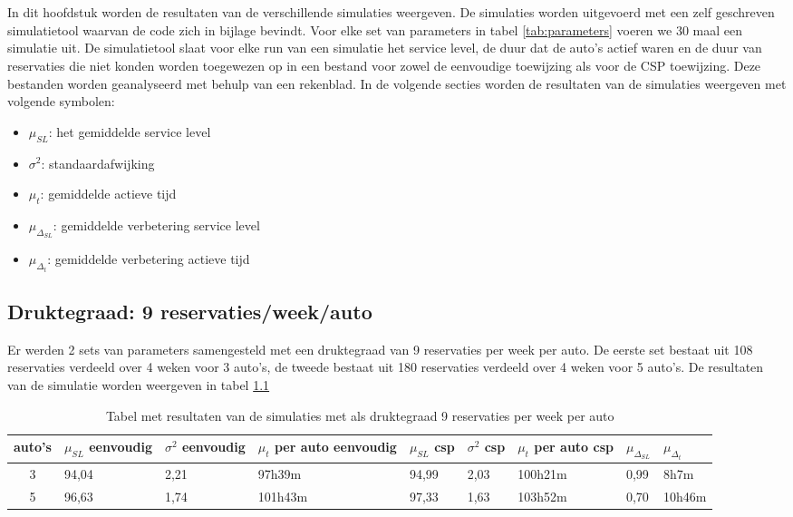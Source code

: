 \chapter{}
\label{ch:resultaten-simulaties}
In dit hoofdstuk worden de resultaten van de verschillende simulaties weergeven. De simulaties worden uitgevoerd met een zelf geschreven simulatietool waarvan de code zich in bijlage bevindt. Voor elke set van parameters in tabel \ref{tab:parameters} voeren we 30 maal een simulatie uit. De simulatietool slaat voor elke run van een simulatie het service level, de duur dat de auto's actief waren en de duur van reservaties die niet konden worden toegewezen op in een bestand voor zowel de eenvoudige toewijzing als voor de CSP toewijzing. Deze bestanden worden geanalyseerd met behulp van een rekenblad.
In de volgende secties worden de resultaten van de simulaties weergeven met volgende symbolen:
\begin{itemize}
	\item $\mu_{ SL}$: het gemiddelde service level
	\item $\sigma^2$: standaardafwijking
	\item $\mu_{ t}$: gemiddelde actieve tijd
	\item $\mu_{\Delta_{ SL}}$: gemiddelde verbetering service level
	\item $\mu_{\Delta_{ t}}$: gemiddelde verbetering actieve tijd
\end{itemize}

\section{Druktegraad: 9 reservaties/week/auto}
Er werden 2 sets van parameters samengesteld met een druktegraad van 9 reservaties per week per auto. 
De eerste set bestaat uit 108 reservaties verdeeld over 4 weken voor 3 auto's, de tweede bestaat uit 180 reservaties verdeeld over 4 weken voor 5 auto's. 
De resultaten van de simulatie worden weergeven in tabel \ref{tab:resultaten9}
\begin{table}[h]
	\centering
	\begin{tabular}{ | c | p{1.5cm} | p{1.5cm} | p{1.5cm} | p{1.5cm} | p{1.5cm} | p{1.5cm} | p{1.5cm} | p{1.5cm} |}
		\hline
		auto's & $\mu_{ SL}$ eenvoudig & $\sigma^2$ eenvoudig & $\mu_{ t}$ per auto eenvoudig & $\mu_{ SL}$ csp & $\sigma^2$ csp & $\mu_{ t}$ per auto csp & $\mu_{\Delta_{ SL}}$ & $\mu_{\Delta_{ t}}$ \\ \hline
		3 & 94,04 & 2,21 & 97h39m & 94,99 & 2,03 & 100h21m & 0,99 & 8h7m  \\ \hline
		5 & 96,63 & 1,74 & 101h43m & 97,33 & 1,63 & 103h52m & 0,70 & 10h46m \\ \hline
	\end{tabular}
	\caption{Tabel met resultaten van de simulaties met als druktegraad 9 reservaties per week per auto}
	\label{tab:resultaten9}
\end{table}
